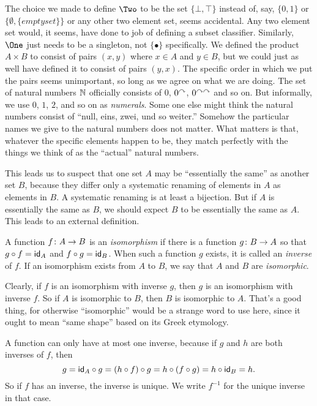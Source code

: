 The choice we made to define $\Two$ to be the set $\{\bot,\top\}$ instead of, say,
$\{0,1\}$ or $\{\emptyset, \{emptyset\}\}$ or any other two element set, seems accidental. 
Any two element set would, it seems, have done to job of defining a subset classifier. 
Similarly, $\One$ just needs to be a singleton, not $\{\bullet\}$ specifically.
We defined the product $A\times B$ to consist of pairs $(x,y)$ where $x\in A$ and $y\in B$, but we could just as well have defined it to consist of pairs $(y,x)$.
The specific order in which we put the pairs seems unimportant, so long as we agree on what we are doing.
The set of natural numbers $\mathbb N$ officially consists of $0$, $0^\curvearrowright$, $0^{\curvearrowright\curvearrowright}$ and so on. 
But informally, we use $0$, $1$, $2$, and so on as \emph{numerals}.
Some one else might think the natural numbers consist of ``null, eins, zwei, und so weiter.''
Somehow the particular names we give to the natural numbers does not matter.
What matters is that, whatever the specific elements happen to be, they match perfectly with the things we think of as the ``actual'' natural numbers.

This leads us to suspect that one set $A$ may be ``essentially the same'' as another set $B$, because they differ only a systematic renaming of elements in $A$ as elements in $B$. 
A systematic renaming is at least a bijection.
But if $A$ is essentially the same as $B$, we should expect $B$ to be essentially the same as $A$. This leads to an external definition.

\begin{defn}
	A function ${f}\colon{A}\to{B}$ is an \emph{isomorphism} if there is a function
	${g}\colon{B}\to{A}$ so that $g\circ f = \textsf{id}_A$ and $f\circ g= \textsf{id}_B$. 
	When such a function $g$ exists, it is called an \emph{inverse} of $f$. 
	If an isomorphism exists from $A$ to $B$, we say that $A$ and $B$ are \emph{isomorphic}.
\end{defn}

Clearly, if $f$ is an isomorphism with inverse $g$, then $g$ is an isomorphism with inverse $f$. 
So if $A$ is isomorphic to $B$, then $B$ is isomorphic to $A$. 
That's a good thing, for otherwise ``isomorphic'' would be a strange word to use here, since it ought to mean ``same shape'' based on its Greek etymology. 

A function  can only have at most one inverse, because if $g$ and $h$ are both inverses of $f$,
then \[g = \textsf{id}_A\circ g = (h\circ f)\circ g = h\circ (f\circ g)= h\circ \textsf{id}_B = h.\]
So if $f$ has an inverse, the inverse is unique. We write $f^{-1}$ for the unique inverse in that case. 

